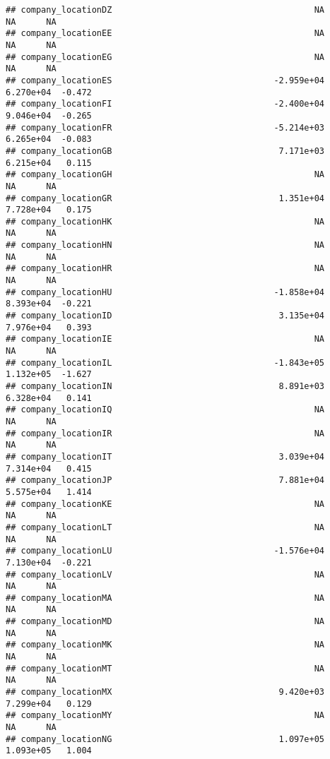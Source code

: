 \documentclass[
]{article}
\begin{document}
\begin{verbatim}
## company_locationDZ                                        NA         NA      NA
## company_locationEE                                        NA         NA      NA
## company_locationEG                                        NA         NA      NA
## company_locationES                                -2.959e+04  6.270e+04  -0.472
## company_locationFI                                -2.400e+04  9.046e+04  -0.265
## company_locationFR                                -5.214e+03  6.265e+04  -0.083
## company_locationGB                                 7.171e+03  6.215e+04   0.115
## company_locationGH                                        NA         NA      NA
## company_locationGR                                 1.351e+04  7.728e+04   0.175
## company_locationHK                                        NA         NA      NA
## company_locationHN                                        NA         NA      NA
## company_locationHR                                        NA         NA      NA
## company_locationHU                                -1.858e+04  8.393e+04  -0.221
## company_locationID                                 3.135e+04  7.976e+04   0.393
## company_locationIE                                        NA         NA      NA
## company_locationIL                                -1.843e+05  1.132e+05  -1.627
## company_locationIN                                 8.891e+03  6.328e+04   0.141
## company_locationIQ                                        NA         NA      NA
## company_locationIR                                        NA         NA      NA
## company_locationIT                                 3.039e+04  7.314e+04   0.415
## company_locationJP                                 7.881e+04  5.575e+04   1.414
## company_locationKE                                        NA         NA      NA
## company_locationLT                                        NA         NA      NA
## company_locationLU                                -1.576e+04  7.130e+04  -0.221
## company_locationLV                                        NA         NA      NA
## company_locationMA                                        NA         NA      NA
## company_locationMD                                        NA         NA      NA
## company_locationMK                                        NA         NA      NA
## company_locationMT                                        NA         NA      NA
## company_locationMX                                 9.420e+03  7.299e+04   0.129
## company_locationMY                                        NA         NA      NA
## company_locationNG                                 1.097e+05  1.093e+05   1.004

\end{verbatim}
\end{document}

